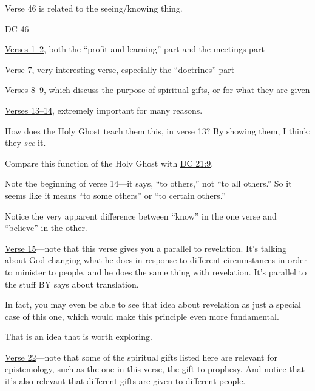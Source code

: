 \begin{compactdesc}
\begin{compactitem}
					\item Verse 46 is related to the seeing/knowing thing.
				\end{compactitem}
			\item \hyperref[DC46]{DC 46}
				\begin{compactitem}
					\item \hyperref[DC46-1]{Verses 1--2}, both the ``profit and learning'' part and the meetings part
					\item \hyperref[DC46-7]{Verse 7}, very interesting verse, especially the ``doctrines'' part
					\item \hyperref[DC46-8]{Verses 8--9}, which discuss the purpose of spiritual gifts, or for what they are given
					\item \hyperref[DC46-13]{Verses 13--14}, extremely important for many reasons.
						\begin{compactitem}
							\item How does the Holy Ghost teach them this, in verse 13? By showing them, I think; they \textit{see} it.
							\item Compare this function of the Holy Ghost with \hyperref[DC21-9]{DC 21:9}.
							\item Note the beginning of verse 14---it says, ``to others,'' not ``to all others.'' So it seems like it means ``to some others'' or ``to certain others.''
							\item Notice the very apparent difference between ``know'' in the one verse and ``believe'' in the other.
						\end{compactitem}
					\item \hyperref[DC46-15]{Verse 15}---note that this verse gives you a parallel to revelation. It's talking about God changing what he does in response to different circumstances in order to minister to people, and he does the same thing with revelation. It's parallel to the stuff BY says about translation.
						\begin{compactitem}
							\item In fact, you may even be able to see that idea about revelation as just a special case of this one, which would make this principle even more fundamental.
							\item That is an idea that is worth exploring.
						\end{compactitem}
					\item \hyperref[DC46-22]{Verse 22}---note that some of the spiritual gifts listed here are relevant for epistemology, such as the one in this verse, the gift to prophesy. And notice that it's also relevant that different gifts are given to different people.

\end{compactitem}
\end{compactdesc}
